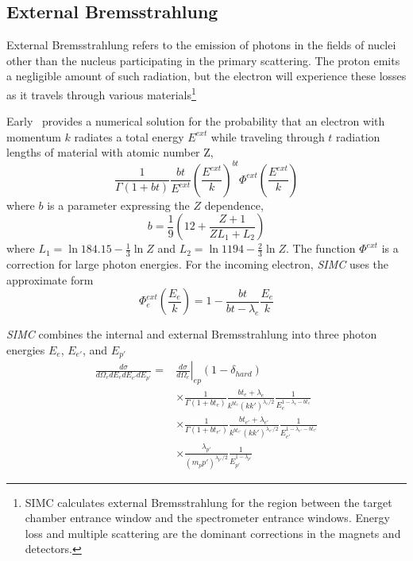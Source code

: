 \subsection{External Bremsstrahlung}
External Bremsstrahlung refers to the emission of photons in the fields of
nuclei other than the nucleus participating in the primary scattering.
The proton emits a negligible amount of such radiation, but the electron will
experience these losses as it travels through various materials\footnote{
SIMC calculates external Bremsstrahlung for the region between the target
chamber entrance window and the spectrometer entrance windows.
Energy loss and multiple scattering are the dominant corrections in the magnets
and detectors.}

Early~\cite{Early_1973} provides a numerical solution for the probability that
an electron with momentum $k$ radiates a total energy $E^{ext}$ while traveling
through $t$ radiation lengths of material with atomic number Z,
\begin{equation}
    \frac{1}{\Gamma(1+bt)}
    \frac{bt}{E^{ext}}
    \left(\frac{E^{ext}}{k}\right)^{bt}
    \Phi^{ext}\left(\frac{E^{ext}}{k}\right)
\end{equation}
where $b$ is a parameter expressing the $Z$ dependence,
\begin{equation}
    b = \frac{1}{9}\left(12 + \frac{Z+1}{ZL_1+L_2}\right)
\end{equation}
where
$L_1 = \ln{184.15} - \frac{1}{3} \ln Z$
and
$L_2 = \ln{1194} - \frac{2}{3} \ln Z$.
The function $\Phi^{ext}$ is a correction for large photon energies.
For the incoming electron, \textit{SIMC} uses the approximate form
\begin{equation}
    \Phi^{ext}_e\left(\frac{E_e}{k}\right) = 1 - \frac{bt}{bt-\lambda_e}\frac{E_e}{k}
\end{equation}


\textit{SIMC} combines the internal and external Bremsstrahlung into three
photon energies $E_e$, $E_{e'}$, and $E_{p'}$
\begin{align}
\frac{d\sigma}{d\Omega_{e} dE_{e} dE_{e'} dE_{p'}} =&\left.\frac{d\sigma}{d\Omega_{e}}\right|_{ep} \left(1-\delta_{hard}\right) \\
    &\times \frac{1}{\Gamma\left(1+b t_{e}\right)}  \frac{bt_{e}  + \lambda_{e}} {k^{bt_{e}} (kk')^{\lambda_{e}/2}}  \frac{1}{E_{e}^{1 -\lambda_{e} -bt_{e}}} \\
    &\times \frac{1}{\Gamma\left(1+b t_{e'}\right)} \frac{bt_{e'} + \lambda_{e'}}{k^{bt_{e'}}(kk')^{\lambda_{e'}/2}} \frac{1}{E_{e'}^{1-\lambda_{e'}-bt_{e'}}} \\
    &\times \frac{\lambda_{p'}}{(m_p p')^{\lambda_{p'}/2}} \frac{1}{E_{p'}^{1-\lambda_{p'}}}
\end{align}

